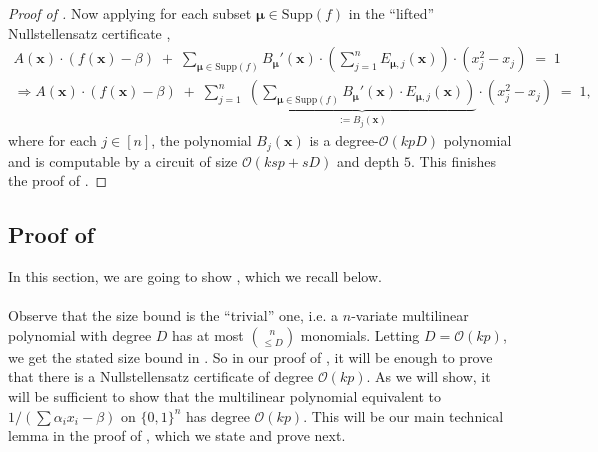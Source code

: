 \documentclass[11pt]{article}
\newcommand{\Boo}{\{0,1 \}}
\newcommand{\bigO}{\mathcal{O}}
\newcommand{\paren}[1]{\left( #1 \right)}
\begin{document}
\begin{proof}[Proof of ]
\noindent
Now applying  for each subset $\bm{\mu} \in \mathrm{Supp}(f)$ in the ``lifted'' Nullstellensatz certificate ,
\begin{align*}
    A(\mathbf{x}) \cdot (f(\mathbf{x}) - \beta) \; + \; \sum_{\bm{\mu} \in \mathrm{Supp}(f)} B_{\bm{\mu}}'(\mathbf{x}) \cdot \paren{\sum_{j=1}^{n} E_{\bm{\mu},j}(\mathbf{x})} \cdot (x_{j}^{2} - x_{j}) \; = \; 1 \\
    \Rightarrow A(\mathbf{x}) \cdot (f(\mathbf{x}) - \beta) \; + \; \sum_{j=1}^{n} \; \underbrace{\paren{\sum_{\bm{\mu} \in \mathrm{Supp}(f)} B_{\bm{\mu}}'(\mathbf{x}) \cdot E_{\bm{\mu},j}(\mathbf{x}) }}_{:= B_{j}(\mathbf{x})} \cdot (x_{j}^{2} - x_{j}) \; = \; 1,    
\end{align*}
where for each $j \in [n]$, the polynomial $B_{j}(\mathbf{x})$ is a degree-$\bigO(kpD)$ polynomial and is computable by a circuit of size $\bigO(k sp + sD)$ and depth $5$. This finishes the proof of .
\end{proof}







\subsection{Proof of }\label{subsec:proof-ub-degree}
In this section, we are going to show , which we recall below.\\

\degreeupperbound*

\paragraph{}Observe that the size bound is the ``trivial'' one, i.e. a $n$-variate multilinear polynomial with degree $D$ has at most $\binom{n}{\leq D}$ monomials. Letting $D = \bigO(kp)$, we get the stated size bound in . So in our proof of , it will be enough to prove that there is a Nullstellensatz certificate of degree $\bigO(kp)$. As we will show, it will be sufficient to show that the multilinear polynomial equivalent to $1/(\sum \alpha_{i} x_{i} - \beta)$ on $\Boo^{n}$ has degree $\bigO(kp)$. This will be our main technical lemma in the proof of , which we state and prove next.\\
\end{document}
